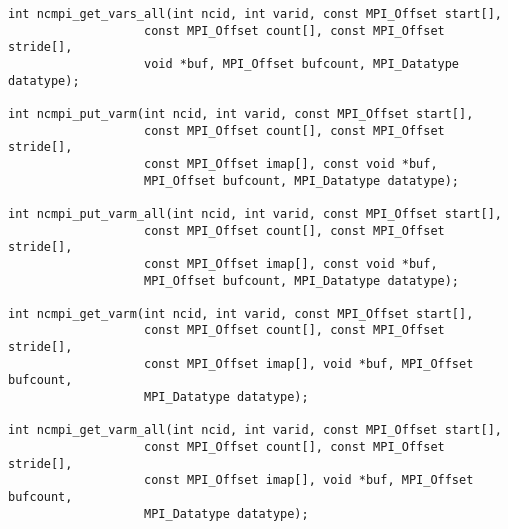 \begin{verbatim}
int ncmpi_get_vars_all(int ncid, int varid, const MPI_Offset start[],
                   const MPI_Offset count[], const MPI_Offset stride[],
                   void *buf, MPI_Offset bufcount, MPI_Datatype datatype); 

int ncmpi_put_varm(int ncid, int varid, const MPI_Offset start[],
                   const MPI_Offset count[], const MPI_Offset stride[],
                   const MPI_Offset imap[], const void *buf,
                   MPI_Offset bufcount, MPI_Datatype datatype); 

int ncmpi_put_varm_all(int ncid, int varid, const MPI_Offset start[],
                   const MPI_Offset count[], const MPI_Offset stride[],
                   const MPI_Offset imap[], const void *buf,
                   MPI_Offset bufcount, MPI_Datatype datatype); 

int ncmpi_get_varm(int ncid, int varid, const MPI_Offset start[],
                   const MPI_Offset count[], const MPI_Offset stride[],
                   const MPI_Offset imap[], void *buf, MPI_Offset bufcount,
                   MPI_Datatype datatype); 

int ncmpi_get_varm_all(int ncid, int varid, const MPI_Offset start[],
                   const MPI_Offset count[], const MPI_Offset stride[],
                   const MPI_Offset imap[], void *buf, MPI_Offset bufcount,
                   MPI_Datatype datatype); 
\end{verbatim}

